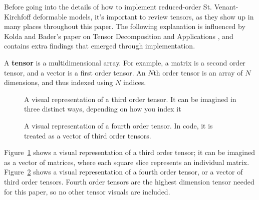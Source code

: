 \documentclass[twocolumn,10pt]{asme2ej}
\begin{document}
Before going into the details of how to implement reduced-order St. Venant-Kirchfoff deformable models, it's important to review tensors, as they show up in many places throughout this paper. The following explanation is influenced by Kolda and Bader's paper on Tensor Decomposition and Applications \cite{tensors}, and contains extra findings that emerged through implementation.

A \textbf{tensor} is a multidimensional array. For example, a matrix is a second order tensor, and a vector is a first order tensor. An $N$th order tensor is an array of $N$ dimensions, and thus indexed using $N$ indices.

\begin{figure}
\caption{A visual representation of a third order tensor. It can be imagined in three distinct ways, depending on how you index it}
\label{fig_ex1.png}
\end{figure}
\begin{figure}
\caption{A visual representation of a fourth order tensor. In code, it is treated as a vector of third order tensors.}
\label{fig_ex2.png}
\end{figure}

Figure~\ref{fig_ex1.png} shows a visual representation of a third order tensor; it can be imagined as a vector of matrices, where each square slice represents an individual matrix. Figure~\ref{fig_ex2.png} shows a visual representation of a fourth
order tensor, or a vector of third order tensors. Fourth order tensors are the highest dimension tensor needed for this paper, so no other tensor visuals are included.
\end{document}
